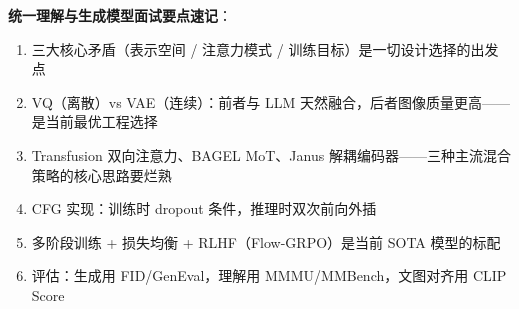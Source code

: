 \begin{summarybox}
\textbf{统一理解与生成模型面试要点速记}：
\begin{enumerate}
  \item 三大核心矛盾（表示空间 / 注意力模式 / 训练目标）是一切设计选择的出发点
  \item VQ（离散）vs VAE（连续）：前者与 LLM 天然融合，后者图像质量更高——是当前最优工程选择
  \item Transfusion 双向注意力、BAGEL MoT、Janus 解耦编码器——三种主流混合策略的核心思路要烂熟
  \item CFG 实现：训练时 dropout 条件，推理时双次前向外插
  \item 多阶段训练 + 损失均衡 + RLHF（Flow-GRPO）是当前 SOTA 模型的标配
  \item 评估：生成用 FID/GenEval，理解用 MMMU/MMBench，文图对齐用 CLIP Score
\end{enumerate}
\end{summarybox}
